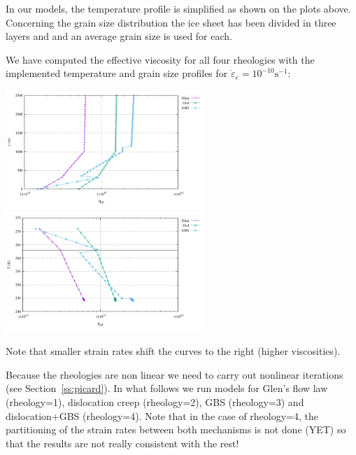 In our models, the temperature profile is simplified 
as shown on the plots above. 
Concerning the grain size distribution the ice sheet has been divided in three 
layers and and an average grain size is used for each.

We have computed the effective viscosity for all four rheologies with the 
implemented temperature and grain size profiles for $\dot{\varepsilon}_e=10^{-10}\text{s}^{-1}$:

\begin{center}
\includegraphics[width=7.5cm]{python_codes/fieldstone_59/results/profiles}
\includegraphics[width=7.5cm]{python_codes/fieldstone_59/results/profiles2}\\
\end{center}
Note that smaller strain rates shift the curves to the right (higher viscosities).



Because the rheologies are non linear we need to carry out nonlinear iterations (see Section~\ref{ss:picard}).
In what follows we run models for Glen's flow law (rheology=1), 
dislocation creep (rheology=2), GBS (rheology=3) and dislocation+GBS (rheology=4).
Note that in the case of rheology=4, the partitioning of the strain rates between both 
mechanisms is not done (YET) so that the results are not really consistent with the rest!

